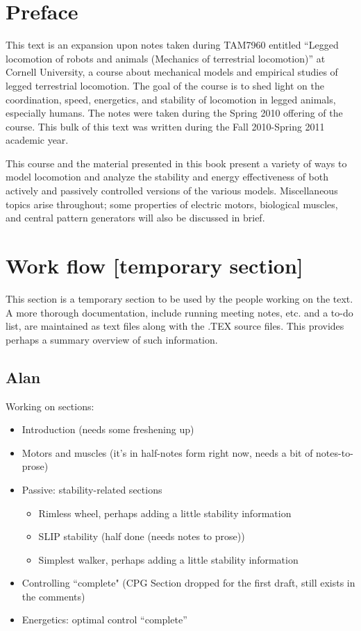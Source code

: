 \chapter*{Preface}

This text is an expansion upon notes taken during TAM7960 entitled ``Legged locomotion of robots and animals
(Mechanics of terrestrial locomotion)'' at Cornell University, a course about mechanical models and empirical studies of legged terrestrial locomotion. The goal of the course is to shed light on the coordination, speed, energetics, and stability of locomotion in legged animals, especially humans. The notes were taken during the Spring 2010 offering of the course. This bulk of this text was written during the Fall 2010-Spring 2011 academic year.

This course and the material presented in this book present a variety of ways to model locomotion and analyze the stability and energy effectiveness of both actively and passively controlled versions of the various models. Miscellaneous topics arise throughout; some properties of electric motors, biological muscles, and central pattern generators will also be discussed in brief.

\chapter*{Work flow [temporary section]}

This section is a temporary section  to be used by the people working on the text. A more thorough documentation, include running meeting notes, etc. and a to-do list, are maintained as text files along with the .TEX source files. This provides perhaps a summary overview of such information.

\section*{Alan}

Working on sections:

\begin{itemize}
\item Introduction (needs some freshening up)
\item Motors and muscles (it's in half-notes form right now, needs a bit of notes-to-prose)

\item Passive: stability-related sections
\begin{itemize}
\item Rimless wheel, perhaps adding a little stability information
\item SLIP stability (half done (needs notes to prose))
\item Simplest walker, perhaps adding a little stability information
\end{itemize}

\item Controlling ``complete" (CPG Section dropped for the first draft, still exists in the comments)
\item Energetics: optimal control ``complete''
\end{itemize}

